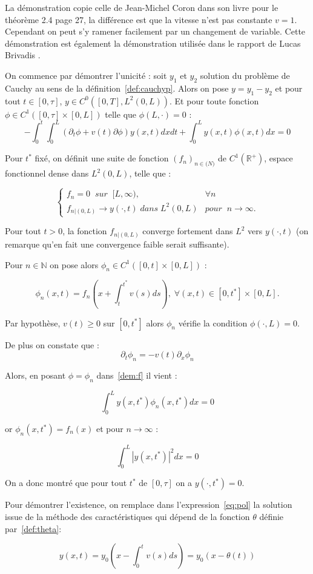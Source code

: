 \documentclass[a4paper]{article}
\begin{document}
\begin{preuve}
	La démonstration copie celle de Jean-Michel Coron dans son livre \cite{JMCoron} pour le théorème 2.4 page 27, la différence est que la vitesse n'est pas constante $v=1$. Cependant on peut s'y ramener facilement par un changement de variable. Cette démonstration est également la démonstration utilisée dans le rapport de Lucas Brivadis \cite{LBrivadis}. 
	
	On commence par démontrer l'unicité : 
	soit $y_1$ et $y_2$ solution du problème de Cauchy au sens de la définition~\ref{def:cauchyp}. 
	Alors on pose $y=y_1-y_2$ et pour tout $t \in [0,\tau]$, $y \in C^0([0,T],L^2(0,L))$.
	Et pour toute fonction $\phi \in C^1([0,\tau] \times [0,L])$ telle que $\phi (L,\cdot)=0$ :
\begin{equation}
	\label{dem:f}
	-\int_0^t \int_0^L (\partial_t \phi +v(t)\partial \phi) y(x,t) dxdt 
			+ \int_0^L y(x,t) \phi (x,t) dx =0
\end{equation}

	Pour $t^*$ fixé, on définit une suite de fonction $(f_n)_{n \in \mathbb(N)}$ de $C^1(\mathbb{R}^+)$, espace fonctionnel dense dans $L^2(0,L)$, telle que :
	
\[
\begin{cases}
	f_n =0 \; \; sur \; \; [L, \infty), & \forall n \\
	f_{n|(0,L)} \to y(\cdot,t) \; dans \; L^2(0,L) & pour \; \;  n\rightarrow \infty.
\end{cases}
\]

Pour tout $t>0$, la fonction $f_{n|(0,L)}$ converge fortement dans $L^2$ vers $y(\cdot,t)$ (on remarque qu'en fait une convergence faible serait suffisante).

Pour $n \in \mathbb{N}$ on pose alors $\phi_n \in C^1([0,t]\times [0,L])$ :

\[ \phi_n(x,t) = f_n(x + \int_t^{t^*} v(s)ds), \; \forall (x,t) \in [0,t^*]\times [0,L]. \]

Par hypothèse, $v(t) \geq 0$ sur $[0, t^*]$ alors $\phi_n$ vérifie la condition $\phi (\cdot, L)=0$.

De plus on constate que :
\[ \partial_t \phi_n = -v(t) \partial_x \phi_n \]

Alors, en posant $\phi = \phi_n$ dans~\eqref{dem:f} il vient :

\[ \int_0^L y(x,t^*) \phi_n (x,t^*) dx =0 \]

or $\phi_n (x,t^*) = f_n(x)$ et pour $n \rightarrow \infty$ :

\[ \int_0^L |y(x,t^*)|^2 dx =0 \]

On a donc montré que pour tout $t^*$ de $[0,\tau]$ on a $y(\cdot, t^*) =0 $.

Pour démontrer l'existence, on remplace dans l'expression~\eqref{eq:pol} la solution issue de la méthode des caractéristiques qui dépend de la fonction $\theta$ définie par~\eqref{def:theta}:

\begin{equation}
	\label{sol:p}
		y(x,t) = y_0(x-\int_0^tv(s)ds) = y_0(x-\theta(t))
\end{equation}

\end{preuve}
\end{document}
